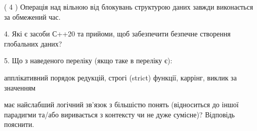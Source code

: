 \documentclass[12pt, ukrainian]{article}
\begin{document}
\begin {large}
{( 4 ) Операція над вільною від блокувань структурою даних завжди виконається за обмежений час.%


\vspace{5mm}
4. Які є засоби С++20 та прийоми, щоб забезпечити безпечне створення глобальних даних?



\vspace{5mm}
5. Що з наведеного переліку (якщо таке в переліку є):

\vspace{4mm}
\qquad апплікативний порядок редукцій, строгі (strict) функції, каррінг, виклик за значенням

\vspace{4mm}
має найслабший логічний зв’язок з більшістю понять (відноситься до іншої парадигми та/або виривається з контексту чи не дуже сумісне)? Відповідь пояснити.

}
\end {large}
\end{document}
